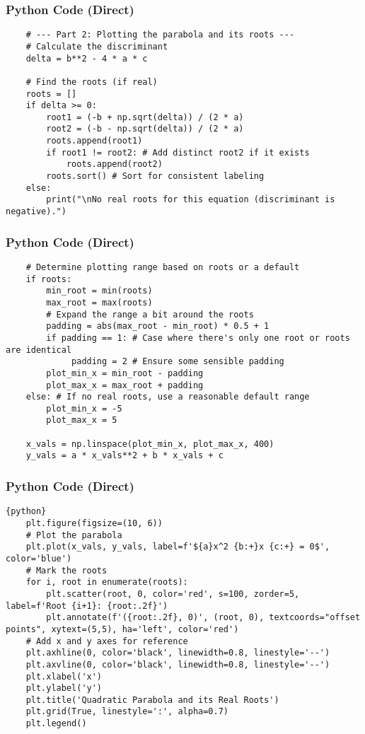 \documentclass{beamer}
\begin{document}
\begin{frame}[fragile]
\frametitle{Python Code (Direct)}
\begin{lstlisting}
    # --- Part 2: Plotting the parabola and its roots ---
    # Calculate the discriminant
    delta = b**2 - 4 * a * c

    # Find the roots (if real)
    roots = []
    if delta >= 0:
        root1 = (-b + np.sqrt(delta)) / (2 * a)
        root2 = (-b - np.sqrt(delta)) / (2 * a)
        roots.append(root1)
        if root1 != root2: # Add distinct root2 if it exists
            roots.append(root2)
        roots.sort() # Sort for consistent labeling
    else:
        print("\nNo real roots for this equation (discriminant is negative).")
\end{lstlisting}
\end{frame}

\begin{frame}[fragile]
\frametitle{Python Code (Direct)}
\begin{lstlisting}
    # Determine plotting range based on roots or a default
    if roots:
        min_root = min(roots)
        max_root = max(roots)
        # Expand the range a bit around the roots
        padding = abs(max_root - min_root) * 0.5 + 1
        if padding == 1: # Case where there's only one root or roots are identical
             padding = 2 # Ensure some sensible padding
        plot_min_x = min_root - padding
        plot_max_x = max_root + padding
    else: # If no real roots, use a reasonable default range
        plot_min_x = -5
        plot_max_x = 5

    x_vals = np.linspace(plot_min_x, plot_max_x, 400)
    y_vals = a * x_vals**2 + b * x_vals + c
\end{lstlisting}
\end{frame}

\begin{frame}[fragile]
\frametitle{Python Code (Direct)}
\begin{lstlisting}{python}
    plt.figure(figsize=(10, 6))
    # Plot the parabola
    plt.plot(x_vals, y_vals, label=f'${a}x^2 {b:+}x {c:+} = 0$', color='blue')
    # Mark the roots
    for i, root in enumerate(roots):
        plt.scatter(root, 0, color='red', s=100, zorder=5, label=f'Root {i+1}: {root:.2f}')
        plt.annotate(f'({root:.2f}, 0)', (root, 0), textcoords="offset points", xytext=(5,5), ha='left', color='red')
    # Add x and y axes for reference
    plt.axhline(0, color='black', linewidth=0.8, linestyle='--')
    plt.axvline(0, color='black', linewidth=0.8, linestyle='--')
    plt.xlabel('x')
    plt.ylabel('y')
    plt.title('Quadratic Parabola and its Real Roots')
    plt.grid(True, linestyle=':', alpha=0.7)
    plt.legend()
\end{lstlisting}
\end{frame}
\end{document}
